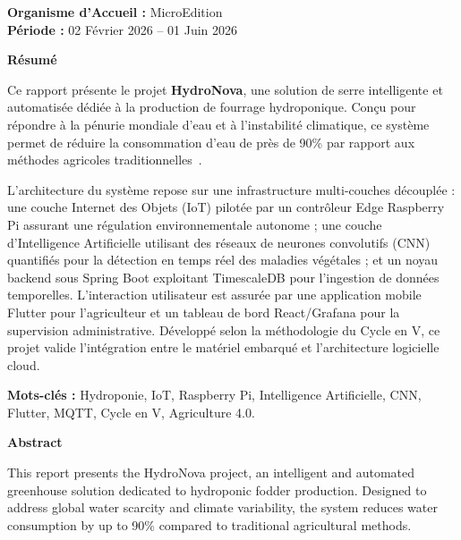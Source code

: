 \documentclass[a4paper,12pt,twoside]{report}
\begin{document}
\begin{titlepage}
\begin{center}
    \vfill
    {\fontsize{12}{15}\selectfont\textbf{Organisme d'Accueil :} MicroEdition}\\[0.4cm]
    {\fontsize{12}{15}\selectfont\textbf{Période :} 02 Février 2026 -- 01 Juin 2026}\\[0.4cm]
    \vspace*{0.5cm}
  \end{center}
\end{titlepage}

\clearpage
\thispagestyle{preStyle}
\begin{center}
  {\fontsize{14}{17}\selectfont\bfseries Résumé}
\end{center}
\noindent
Ce rapport présente le projet \textbf{HydroNova}, une solution de serre intelligente et automatisée dédiée à la production de fourrage hydroponique. Conçu pour répondre à la pénurie mondiale d'eau et à l'instabilité climatique, ce système permet de réduire la consommation d'eau de près de 90\% par rapport aux méthodes agricoles traditionnelles~\cite{hydroponics_water}.

L'architecture du système repose sur une infrastructure multi-couches découplée : une couche Internet des Objets (IoT) pilotée par un contrôleur Edge Raspberry Pi assurant une régulation environnementale autonome ; une couche d'Intelligence Artificielle utilisant des réseaux de neurones convolutifs (CNN) quantifiés pour la détection en temps réel des maladies végétales ; et un noyau backend sous Spring Boot exploitant TimescaleDB pour l'ingestion de données temporelles. L'interaction utilisateur est assurée par une application mobile Flutter pour l'agriculteur et un tableau de bord React/Grafana pour la supervision administrative. Développé selon la méthodologie du Cycle en V, ce projet valide l'intégration entre le matériel embarqué et l'architecture logicielle cloud.

\noindent\textbf{Mots-clés :} Hydroponie, IoT, Raspberry Pi, Intelligence Artificielle, CNN, Flutter, MQTT, Cycle en V, Agriculture 4.0.

\vspace{1cm}
\begin{center}
  {\fontsize{14}{17}\selectfont\bfseries Abstract}
\end{center}
\noindent
This report presents the HydroNova project, an intelligent and automated greenhouse solution dedicated to hydroponic fodder production. Designed to address global water scarcity and climate variability, the system reduces water consumption by up to 90\% compared to traditional agricultural methods.
\end{document}
